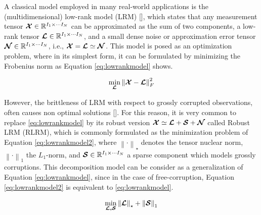 \documentclass[sensors,article,submit,moreauthors,pdftex]{Definitions/mdpi}
\newcommand{\mathten}[1]{\boldsymbol{\mathbf{\mathcal{\MakeUppercase{#1}}}}}
\begin{document}
A classical model employed in many real-world applications is the (multidimensional) low-rank model (LRM) [], which states that any measurement tensor $\mathten{X}\in\mathbb{R}^{I_1\times \cdots I_N}$ can be approximated as the sum of two components, a low-rank tensor $\mathten{L}\in\mathbb{R}^{I_1\times \cdots I_N}$, and a small dense noise or approximation error tensor $\mathten{N}\in\mathbb{R}^{I_1\times \cdots I_N}$, i.e., $\mathten{X} = \mathten{L} \simeq \mathten{N}$. This model is posed as an optimization problem, where in its simplest form, it can be formulated by minimizing the Frobenius norm  as Equation \ref{eq:lowrankmodel} shows.

\begin{equation}
\min_{\mathten{L}} {\left\lVert \mathten{X}-\mathten{L} \right\rVert}_{F}^2
\label{eq:lowrankmodel}
\end{equation}



However, the brittleness of LRM with respect to grossly corrupted observations, often causes non optimal solutions []. For this reason, it is very common to replace \ref{eq:lowrankmodel} by its robust version $\mathten{X} \simeq \mathten{L} + \mathten{S} + \mathten{N}$ called Robust LRM (RLRM), which is commonly formulated as the minimization problem of Equation \ref{eq:lowrankmodel2}, where $\left\lVert \cdot \right\rVert_\star$ denotes the tensor nuclear norm, $\left\lVert \cdot \right\rVert_1$ the $L_1$-norm, and $\mathten{S}\in\mathbb{R}^{I_1\times \cdots I_N}$ a sparse component which models grossly corruptions. This decomposition model can be consider as a generalization of Equation \ref{eq:lowrankmodel}, since in the case of free-corruption, Equation \ref{eq:lowrankmodel2} is equivalent to \ref{eq:lowrankmodel}.

\begin{equation}
\min_{\mathten{L,S}} {\left\lVert\mathten{L}\right\rVert_\star + \left\lVert\mathten{S}\right\rVert_1}
\label{eq:lowrankmodel2}
\end{equation}

\end{document}
